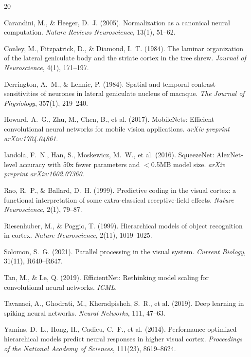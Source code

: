 \documentclass[11pt]{article}
\begin{document}

\begin{thebibliography}{20}

Carandini, M., \& Heeger, D.~J. (2005).
\newblock Normalization as a canonical neural computation.
\newblock \textit{Nature Reviews Neuroscience}, 13(1), 51--62.

Conley, M., Fitzpatrick, D., \& Diamond, I.~T. (1984).
\newblock The laminar organization of the lateral geniculate body and the striate cortex in the tree shrew.
\newblock \textit{Journal of Neuroscience}, 4(1), 171--197.

Derrington, A.~M., \& Lennie, P. (1984).
\newblock Spatial and temporal contrast sensitivities of neurones in lateral geniculate nucleus of macaque.
\newblock \textit{The Journal of Physiology}, 357(1), 219--240.

Howard, A.~G., Zhu, M., Chen, B., et al. (2017).
\newblock MobileNets: Efficient convolutional neural networks for mobile vision applications.
\newblock \textit{arXiv preprint arXiv:1704.04861}.

Iandola, F.~N., Han, S., Moskewicz, M.~W., et al. (2016).
\newblock SqueezeNet: AlexNet-level accuracy with 50x fewer parameters and $<$0.5MB model size.
\newblock \textit{arXiv preprint arXiv:1602.07360}.

Rao, R.~P., \& Ballard, D.~H. (1999).
\newblock Predictive coding in the visual cortex: a functional interpretation of some extra-classical receptive-field effects.
\newblock \textit{Nature Neuroscience}, 2(1), 79--87.

Riesenhuber, M., \& Poggio, T. (1999).
\newblock Hierarchical models of object recognition in cortex.
\newblock \textit{Nature Neuroscience}, 2(11), 1019--1025.

Solomon, S.~G. (2021).
\newblock Parallel processing in the visual system.
\newblock \textit{Current Biology}, 31(11), R640--R647.

Tan, M., \& Le, Q. (2019).
\newblock EfficientNet: Rethinking model scaling for convolutional neural networks.
\newblock \textit{ICML}.

Tavanaei, A., Ghodrati, M., Kheradpisheh, S.~R., et al. (2019).
\newblock Deep learning in spiking neural networks.
\newblock \textit{Neural Networks}, 111, 47--63.

Yamins, D.~L., Hong, H., Cadieu, C.~F., et al. (2014).
\newblock Performance-optimized hierarchical models predict neural responses in higher visual cortex.
\newblock \textit{Proceedings of the National Academy of Sciences}, 111(23), 8619--8624.

\end{thebibliography}
\end{document}
